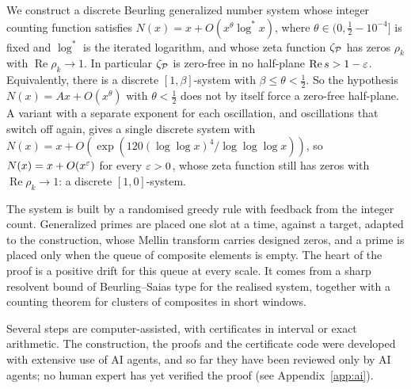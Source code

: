 We construct a discrete Beurling generalized number system whose integer counting function satisfies
$N(x)=x+O(x^{\theta}\log^*x)$, where $\theta\in(0,\tfrac12-10^{-4}]$ is fixed and $\log^*$ is the iterated logarithm, and whose
zeta function $\zeta_{\mathcal{P}}$ has zeros $\rho_k$ with $\operatorname{Re}\rho_k\to1$. In particular $\zeta_{\mathcal{P}}$ is zero-free in no
half-plane $\operatorname{Re}s>1-\varepsilon$. Equivalently, there is a discrete $[1,\beta]$-system with $\beta\le\theta<\tfrac12$. So the
hypothesis $N(x)=Ax+O(x^{\theta})$ with $\theta<\tfrac12$ does not by itself force a zero-free half-plane.
A variant with a separate exponent for each oscillation, and oscillations that switch off again, gives a single discrete system
with $N(x)=x+O(\exp(120(\log\log x)^4/\log\log\log x))$, so $N(x)=x+O(x^{\varepsilon})$ for every $\varepsilon>0$, whose zeta function still has
zeros with $\operatorname{Re}\rho_k\to1$: a discrete $[1,0]$-system.

The system is built by a randomised greedy rule with feedback from the integer count. Generalized primes are placed one
slot at a time, against a target, adapted to the construction, whose Mellin transform carries designed zeros, and a prime is
placed only when the queue of composite elements is empty. The heart of the proof is a positive drift for this queue at every scale. It comes from
a sharp resolvent bound of Beurling--Saias type for the realised system, together with a counting theorem for clusters of
composites in short windows.

Several steps are computer-assisted, with certificates in interval or exact arithmetic. The construction, the proofs and the
certificate code were developed with extensive use of AI agents, and so far they have been reviewed only by AI agents; no
human expert has yet verified the proof (see Appendix~\ref{app:ai}).
